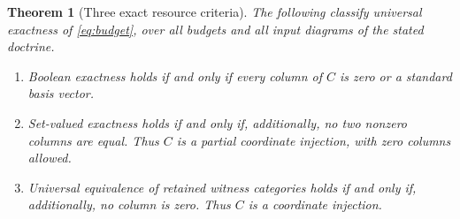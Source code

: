 \documentclass[11pt]{article}
\newtheorem{theorem}{Theorem}[section]
\theoremstyle{definition}\newtheorem{definition}[theorem]{Definition}
\theoremstyle{remark}\newtheorem{remark}[theorem]{Remark}
\begin{document}
\begin{theorem}[Three exact resource criteria]\label{thm:matrix}
The following classify universal exactness of \eqref{eq:budget}, over
all budgets and all input diagrams of the stated doctrine.
\begin{enumerate}[label=(\roman*)]
\item Boolean exactness holds if and only if every column of $C$ is zero
or a standard basis vector.
\item Set-valued exactness holds if and only if, additionally, no two
nonzero columns are equal. Thus $C$ is a partial coordinate injection,
with zero columns allowed.
\item Universal equivalence of retained witness categories holds if and
only if, additionally, no column is zero. Thus $C$ is a coordinate injection.
\end{enumerate}
\end{theorem}
\end{document}
